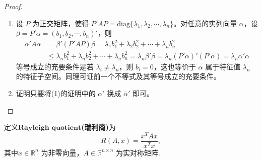 \documentclass[../../main.tex]{subfiles}%
\begin{document}
\begin{proof}
\begin{enumerate}[(1)]
\item 设 \(P\) 为正交矩阵，使得 \(P'AP = \mathrm{diag}\{\lambda_1,\lambda_2,\cdots,\lambda_n\}\)。对任意的实列向量 \(\alpha\)，设 \(\beta = P'\alpha = (b_1,b_2,\cdots,b_n)'\)，则
\begin{align*}
\alpha'A\alpha &= \beta'(P'AP)\beta = \lambda_1b_1^2 + \lambda_2b_2^2 + \cdots + \lambda_nb_n^2\\
&\leqslant  \lambda_nb_1^2 + \lambda_nb_2^2 + \cdots + \lambda_nb_n^2 = \lambda_n\beta'\beta = \lambda_n(P'\alpha)'(P'\alpha) = \lambda_n\alpha'\alpha
\end{align*}
等号成立的充要条件是若 \(\lambda_i \neq \lambda_n\)，则 \(b_i = 0\)，这也等价于 \(\alpha\) 属于特征值 \(\lambda_n\) 的特征子空间。同理可证前一个不等式及其等号成立的充要条件。

\item 证明只要将(1)的证明中的 \(\alpha'\) 换成 \(\overline{\alpha}'\) 即可。
\end{enumerate}

\end{proof}

\begin{definition}
定义$\mathbf{Rayleigh}\,\,\mathbf{quotient}$\textbf{(瑞利商)}为
\[
R(A, x) = \frac{x^T A x}{x^T x},
\]
其中\( x \in \mathbb{R}^n \) 为非零向量，\( A \in \mathbb{R}^{n \times n} \) 为实对称矩阵.
\end{definition}
\end{document}
